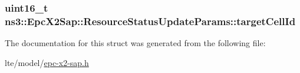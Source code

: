 \subsubsection[{\texorpdfstring{target\+Cell\+Id}{targetCellId}}]{\setlength{\rightskip}{0pt plus 5cm}uint16\+\_\+t ns3\+::\+Epc\+X2\+Sap\+::\+Resource\+Status\+Update\+Params\+::target\+Cell\+Id}\hypertarget{structns3_1_1EpcX2Sap_1_1ResourceStatusUpdateParams_a9cc2e4be9a43ba47944e1014297282cf}{}\label{structns3_1_1EpcX2Sap_1_1ResourceStatusUpdateParams_a9cc2e4be9a43ba47944e1014297282cf}


The documentation for this struct was generated from the following file\+:\begin{DoxyCompactItemize}
\item 
lte/model/\hyperlink{epc-x2-sap_8h}{epc-\/x2-\/sap.\+h}\end{DoxyCompactItemize}
